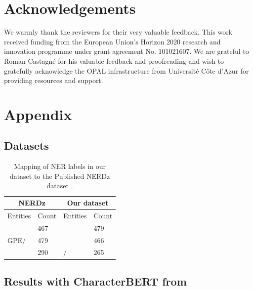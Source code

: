 \documentclass[11pt]{article}
\newcommand{\org}{{\sc {\tt ORG}}\xspace}
\newcommand{\loc}{{\sc {\tt LOC}}\xspace}
\newcommand{\comp}{{\sc {\tt COMP}}\xspace}
\newcommand{\per}{{\sc {\tt PER}}\xspace}
\begin{document}
\section*{Acknowledgements}
We warmly thank the reviewers for their very valuable feedback.
This work  received funding from the European Union’s Horizon 2020
research and innovation programme under grant agreement No. 101021607. 
We are grateful to Roman Castagné for his valuable feedback and proofreading and wish to gratefully acknowledge the OPAL infrastructure from Université Côte d'Azur for providing resources and support. 



\appendix

\section{Appendix}
\label{sec:appendix}
\subsection{Datasets}

\begin{table}[!h]
    \centering
    \footnotesize
\begin{tabular}{llll}
\hline
\multicolumn{2}{c}{NERDz}            & \multicolumn{2}{c}{Our dataset}       \\     
\midrule
\multicolumn{1}{l}{Entities} & Count & \multicolumn{1}{l}{Entities} & Count \\     \toprule
\per                           & 467   & \per                           & 479   \\ 
GPE/\loc                       & 479   & \loc                           & 466   \\ 
\org    
& 290   & \org/\comp                      & 265  \\
    \bottomrule
\end{tabular}%
    \caption{Mapping of NER labels in our dataset to the Published NERDz dataset \cite{touileb2022nerdz}.}
    \label{tab:comp-nerdz}
\end{table}
\subsection{Results with CharacterBERT from \cite{riabi-etal-2021-character}}
\end{document}

